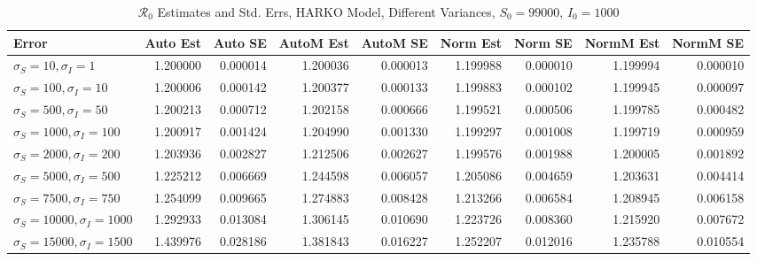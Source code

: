 \documentclass[12pt]{article}
\newcommand{\rr}{\ensuremath{\mathcal{R}_0}}
\begin{document}
\begin{table}[H]
	
	\caption{$\rr$ Estimates and Std. Errs, HARKO Model, 
		Different Variances, $S_0 = 99000$, $I_0 = 1000$}
	\begin{footnotesize}
		\hskip -1.7cm
	\begin{tabular}{l|r|r|r|r|r|r|r|r}
		\hline
		Error & Auto Est & Auto SE & AutoM Est & AutoM SE & Norm Est & Norm SE & NormM Est & NormM SE\\
		\hline
		$\sigma_S = 10, \sigma_I = 1$ & 1.200000 & 0.000014 & 1.200036 & 0.000013 & 1.199988 & 0.000010 & 1.199994 & 0.000010\\
		\hline
		$\sigma_S = 100, \sigma_I = 10$ & 1.200006 & 0.000142 & 1.200377 & 0.000133 & 1.199883 & 0.000102 & 1.199945 & 0.000097\\
		\hline
		$\sigma_S = 500, \sigma_I = 50$ & 1.200213 & 0.000712 & 1.202158 & 0.000666 & 1.199521 & 0.000506 & 1.199785 & 0.000482\\
		\hline
		$\sigma_S = 1000, \sigma_I = 100$ & 1.200917 & 0.001424 & 1.204990 & 0.001330 & 1.199297 & 0.001008 & 1.199719 & 0.000959\\
		\hline
		$\sigma_S = 2000, \sigma_I = 200$ & 1.203936 & 0.002827 & 1.212506 & 0.002627 & 1.199576 & 0.001988 & 1.200005 & 0.001892\\
		\hline
		$\sigma_S = 5000, \sigma_I = 500$ & 1.225212 & 0.006669 & 1.244598 & 0.006057 & 1.205086 & 0.004659 & 1.203631 & 0.004414\\
		\hline
		$\sigma_S = 7500, \sigma_I = 750$ & 1.254099 & 0.009665 & 1.274883 & 0.008428 & 1.213266 & 0.006584 & 1.208945 & 0.006158\\
		\hline
		$\sigma_S = 10000, \sigma_I = 1000$ & 1.292933 & 0.013084 & 1.306145 & 0.010690 & 1.223726 & 0.008360 & 1.215920 & 0.007672\\
		\hline
		$\sigma_S = 15000, \sigma_I = 1500$ & 1.439976 & 0.028186 & 1.381843 & 0.016227 & 1.252207 & 0.012016 & 1.235788 & 0.010554\\
		\hline
	\end{tabular}
\end{footnotesize}
\end{table}
\end{document}
